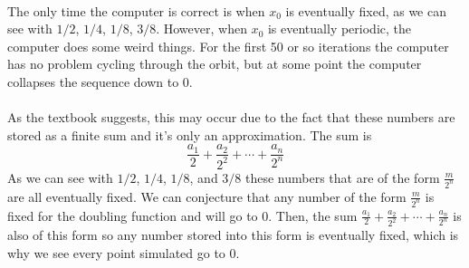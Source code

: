 \documentclass{article}
\begin{document}
\paragraph*{}
The only time the computer is correct is when $x_0$ is eventually fixed, as we can see with $1/2$, $1/4$, $1/8$, $3/8$. However, when $x_0$ is eventually periodic, the computer does some weird things. For the first 50 or so iterations the computer has no problem cycling through the orbit, but at some point the computer collapses the sequence down to 0.  
\paragraph*{}
As the textbook suggests, this may occur due to the fact that these numbers are stored as a finite sum and it's only an approximation. The sum is
\[
	\frac{a_1}{2} + \frac{a_2}{2^2} + \cdots + \frac{a_n}{2^n}
\]
As we can see with $1/2$, $1/4$, $1/8$, and $3/8$ these numbers that are of the form $\frac{m}{2^n}$ are all eventually fixed. We can conjecture that any number of the form $\frac{m}{2^n}$ is fixed for the doubling function and will go to 0. Then, the sum $\frac{a_1}{2} + \frac{a_2}{2^2} + \cdots + \frac{a_n}{2^n}$ is also of this form so any number stored into this form is eventually fixed, which is why we see every point simulated go to 0.
\end{document}
